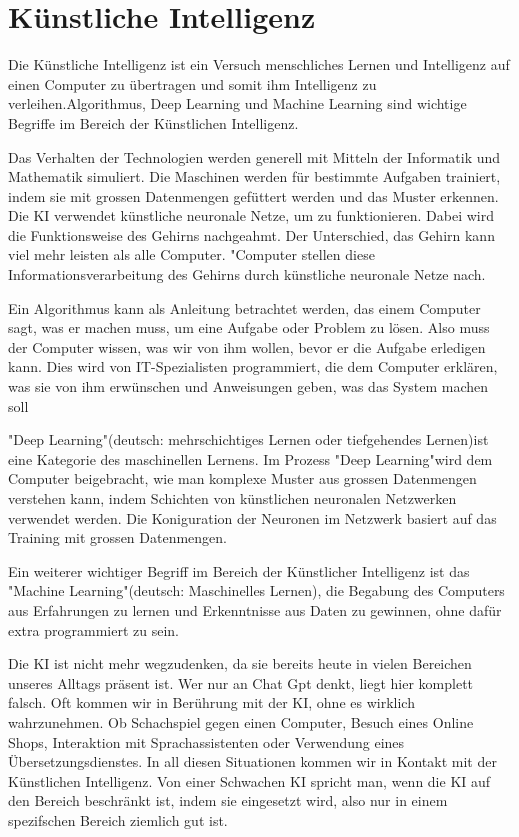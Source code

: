 \section{Künstliche Intelligenz}
\label{sec:ai}

Die Künstliche Intelligenz ist ein Versuch menschliches Lernen und Intelligenz auf einen Computer zu übertragen und somit ihm Intelligenz zu verleihen.Algorithmus, Deep Learning und Machine Learning sind wichtige Begriffe im Bereich der Künstlichen Intelligenz. 

Das Verhalten der Technologien werden generell mit Mitteln der Informatik und Mathematik simuliert. Die Maschinen werden für bestimmte Aufgaben trainiert, indem sie mit grossen Datenmengen gefüttert werden und das Muster erkennen. Die KI verwendet künstliche neuronale Netze, um zu funktionieren. Dabei wird die Funktionsweise des Gehirns nachgeahmt. Der Unterschied, das Gehirn kann viel mehr leisten als alle Computer. "Computer stellen diese Informationsverarbeitung des Gehirns durch künstliche neuronale Netze nach.

Ein Algorithmus kann als Anleitung betrachtet werden, das einem Computer sagt, was er machen muss, um eine Aufgabe oder Problem zu lösen. Also muss der Computer wissen, was wir von ihm wollen, bevor er die Aufgabe erledigen kann. Dies wird von IT-Spezialisten programmiert, die dem Computer erklären, was sie von ihm erwünschen und Anweisungen geben, was das System machen soll

"Deep Learning"(deutsch: mehrschichtiges Lernen oder tiefgehendes Lernen)ist eine Kategorie des maschinellen Lernens. Im Prozess "Deep Learning"wird dem Computer beigebracht, wie man komplexe Muster aus grossen Datenmengen verstehen kann, indem Schichten von künstlichen neuronalen Netzwerken verwendet werden. Die Koniguration der Neuronen im Netzwerk basiert auf das Training mit grossen Datenmengen.

Ein weiterer wichtiger Begriff im Bereich der Künstlicher Intelligenz ist das "Machine Learning"(deutsch: Maschinelles Lernen), die Begabung des Computers aus Erfahrungen zu lernen und Erkenntnisse aus Daten zu gewinnen, ohne dafür extra programmiert zu sein.

Die KI ist nicht mehr wegzudenken, da sie bereits heute in vielen Bereichen unseres Alltags präsent ist. Wer nur an Chat Gpt denkt, liegt hier komplett falsch. Oft kommen wir in Berührung mit der KI, ohne es wirklich wahrzunehmen. Ob Schachspiel gegen einen Computer, Besuch eines Online Shops, Interaktion mit Sprachassistenten oder Verwendung eines Übersetzungsdienstes. In all diesen Situationen kommen wir in Kontakt mit der Künstlichen Intelligenz. Von einer Schwachen KI spricht man, wenn die KI auf den Bereich beschränkt ist, indem sie eingesetzt wird, also nur in einem spezifschen Bereich ziemlich gut ist.

